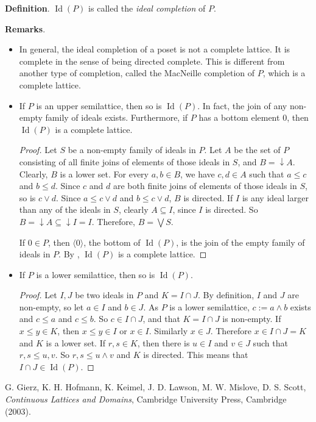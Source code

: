 \documentclass[12pt]{article}
\newcommand{\down}{\downarrow\!\!}
\begin{document}
\textbf{Definition}.  $\operatorname{Id}(P)$ is called the \emph{ideal completion} of $P$.

\textbf{Remarks}.  
\begin{itemize}
\item
In general, the ideal completion of a poset is not a complete lattice.  It is complete in the sense of being directed complete.  This is different from another type of completion, called the MacNeille completion of $P$, which is a complete lattice.  
\item
If $P$ is an upper semilattice, then so is $\operatorname{Id}(P)$.  In fact, the join of any non-empty family of ideals exists.  Furthermore, if $P$ has a bottom element $0$, then $\operatorname{Id}(P)$ is a complete lattice.
\begin{proof}
Let $S$ be a non-empty family of ideals in $P$.  Let $A$ be the set of $P$ consisting of all finite joins of elements of those ideals in $S$, and $B=\down A$.  Clearly, $B$ is a lower set.  For every $a,b\in B$, we have $c,d\in A$ such that $a\le c$ and $b\le d$.  Since $c$ and $d$ are both finite joins of elements of those ideals in $S$, so is $c\vee d$.  Since $a\le c\vee d$ and $b\le c\vee d$, $B$ is directed.  If $I$ is any ideal larger than any of the ideals in $S$, clearly $A\subseteq I$, since $I$ is directed.  So $B=\down A\subseteq \down I=I$.  Therefore, $B=\bigvee S$.

If $0\in P$, then $\langle 0\rangle$, the bottom of $\operatorname{Id}(P)$, is the join of the empty family of ideals in $P$.  By , $\operatorname{Id}(P)$ is a complete lattice.
\end{proof}
\item
If $P$ is a lower semilattice, then so is $\operatorname{Id}(P)$.
\begin{proof}
Let $I,J$ be two ideals in $P$ and $K=I\cap J$.  By definition, $I$ and $J$ are non-empty, so let $a\in I$ and $b\in J$.  As $P$ is a lower semilattice, $c:=a\wedge b$ exists and $c\le a$ and $c\le b$.  So $c \in I\cap J$, and that $K=I\cap J$ is non-empty.  If $x\le y\in K$, then $x\le y\in I$ or $x\in I$.  Similarly $x\in J$.  Therefore $x\in I\cap J=K$ and $K$ is a lower set.  If $r,s\in K$, then there is $u\in I$ and $v\in J$ such that $r,s\le u,v$.  So $r,s\le u\wedge v$ and $K$ is directed.  This means that $I\cap J\in \operatorname{Id}(P)$.
\end{proof}
\end{itemize}

\begin{thebibliography}{8}
 G. Gierz, K. H. Hofmann, K. Keimel, J. D. Lawson, M. W. Mislove, D. S. Scott, {\em Continuous Lattices and Domains}, Cambridge University Press, Cambridge (2003).
\end{thebibliography}
\end{document}
